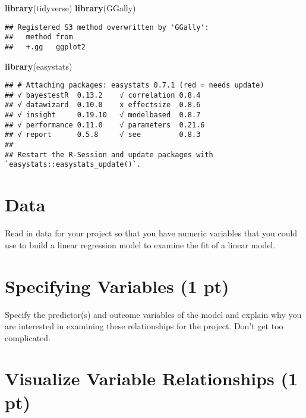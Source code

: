 \documentclass[
]{article}
\newenvironment{Shaded}{\begin{snugshade}}{\end{snugshade}}
\newcommand{\FunctionTok}[1]{\textcolor[rgb]{0.13,0.29,0.53}{\textbf{#1}}}
\newcommand{\NormalTok}[1]{#1}
\begin{document}
\begin{Shaded}
\begin{Highlighting}[]
\FunctionTok{library}\NormalTok{(tidyverse)}
\FunctionTok{library}\NormalTok{(GGally)}
\end{Highlighting}
\end{Shaded}

\begin{verbatim}
## Registered S3 method overwritten by 'GGally':
##   method from   
##   +.gg   ggplot2
\end{verbatim}

\begin{Shaded}
\begin{Highlighting}[]
\FunctionTok{library}\NormalTok{(easystats)}
\end{Highlighting}
\end{Shaded}

\begin{verbatim}
## # Attaching packages: easystats 0.7.1 (red = needs update)
## √ bayestestR  0.13.2    √ correlation 0.8.4  
## √ datawizard  0.10.0    x effectsize  0.8.6  
## √ insight     0.19.10   √ modelbased  0.8.7  
## √ performance 0.11.0    √ parameters  0.21.6 
## √ report      0.5.8     √ see         0.8.3  
## 
## Restart the R-Session and update packages with `easystats::easystats_update()`.
\end{verbatim}

\hypertarget{data}{%
\section{\texorpdfstring{\textbf{Data}}{Data}}\label{data}}

Read in data for your project so that you have numeric variables that
you could use to build a linear regression model to examine the fit of a
linear model.

\hypertarget{specifying-variables-1-pt}{%
\section{\texorpdfstring{\textbf{Specifying Variables} (1
pt)}{Specifying Variables (1 pt)}}\label{specifying-variables-1-pt}}

Specify the predictor(s) and outcome variables of the model and explain
why you are interested in examining these relationships for the project.
Don't get too complicated.

\hypertarget{visualize-variable-relationships-1-pt}{%
\section{\texorpdfstring{\textbf{Visualize Variable Relationships} (1
pt)}{Visualize Variable Relationships (1 pt)}}\label{visualize-variable-relationships-1-pt}}
\end{document}
